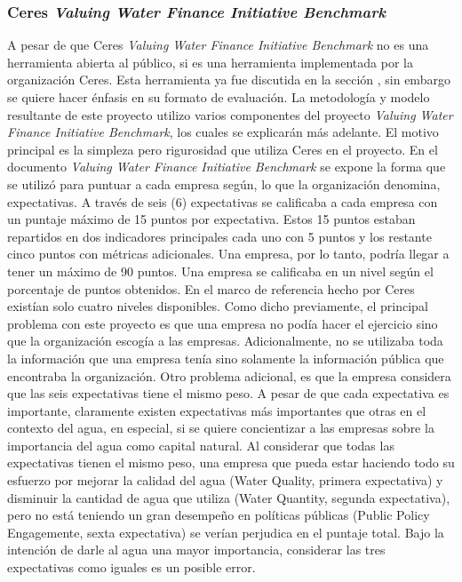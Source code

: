 \subsubsection{Ceres \textit{Valuing Water Finance Initiative Benchmark}} \label{subsubsec:ceres-benchmark}
A pesar de que Ceres \textit{Valuing Water Finance Initiative Benchmark} no es una herramienta abierta al público, si es una herramienta implementada por la organización Ceres. Esta herramienta ya fue discutida en la sección , sin embargo se quiere hacer énfasis en su formato de evaluación. La metodología y modelo resultante de este proyecto utilizo varios componentes del proyecto \textit{Valuing Water Finance Initiative Benchmark}, los cuales se explicarán más adelante. El motivo principal es la simpleza pero rigurosidad que utiliza Ceres en el proyecto. En el documento \textit{Valuing Water Finance Initiative Benchmark} \parencite{ceres-2023B} se expone la forma que se utilizó para puntuar a cada empresa según, lo que la organización denomina, expectativas. A través de seis (6) expectativas se calificaba a cada empresa con un puntaje máximo de 15 puntos por expectativa. Estos 15 puntos estaban repartidos en dos indicadores principales cada uno con 5 puntos y los restante cinco puntos con métricas adicionales. Una empresa, por lo tanto, podría llegar a tener un máximo de 90 puntos. Una empresa se calificaba en un nivel según el porcentaje de puntos obtenidos. En el marco de referencia hecho por Ceres existían solo cuatro niveles disponibles. Como dicho previamente, el principal problema con este proyecto es que una empresa no podía hacer el ejercicio sino que la organización escogía a las empresas. Adicionalmente, no se utilizaba toda la información que una empresa tenía sino solamente la información pública que encontraba la organización. Otro problema adicional, es que la empresa considera que las seis expectativas tiene el mismo peso. A pesar de que cada expectativa es importante, claramente existen expectativas más importantes que otras en el contexto del agua, en especial, si se quiere concientizar a las empresas sobre la importancia del agua como capital natural. Al considerar que todas las expectativas tienen el mismo peso, una empresa que pueda estar haciendo todo su esfuerzo por mejorar la calidad del agua (Water Quality, primera expectativa) y disminuir la cantidad de agua que utiliza (Water Quantity, segunda expectativa), pero no está teniendo un gran desempeño en políticas públicas (Public Policy Engagemente, sexta expectativa) se verían perjudica en el puntaje total. Bajo la intención de darle al agua una mayor importancia, considerar las tres expectativas como iguales es un posible error.

